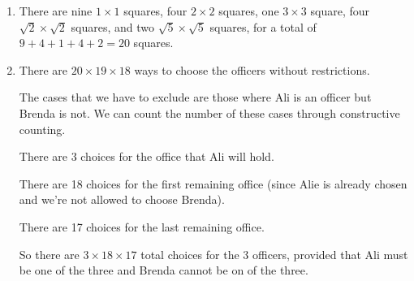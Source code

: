 \documentclass[12pt, letterpaper]{article}
\begin{document}
\begin{enumerate}
    \item There are nine $1\times1$ squares, four $2\times2$ squares, one $3\times3$ square, four $\sqrt{2}\times\sqrt{2}$ squares, and two $\sqrt{5}\times\sqrt{5}$ squares, for a total of $9+4+1+4+2=\boxed{20}$ squares.
    \item There are $20 \times 19 \times 18$ ways to choose the officers without restrictions.
    
    The cases that we have to exclude are those where Ali is an officer but Brenda is not. We can count the number of these cases through constructive counting.
    
    There are 3 choices for the office that Ali will hold.
    
    There are 18 choices for the first remaining office (since Alie is already chosen and we're not allowed to choose Brenda).
    
    There are 17 choices for the last remaining office.
    
    So there are $3 \times 18 \times 17$ total choices for the 3 officers, provided that Ali must be one of the three and Brenda cannot be on of the three.
    

\end{enumerate}
\end{document}
